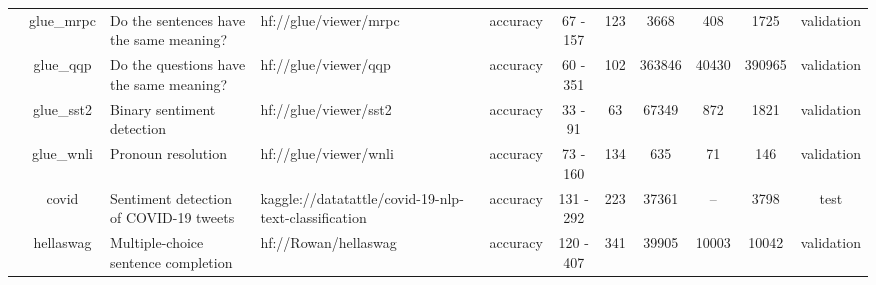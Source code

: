 \begin{landscape}
\begin{table}[ht]
{\begin{tabular}{ccllccccccc}
                                   & glue\_mrpc                          & Do the sentences have the same meaning?                               & hf://glue/viewer/mrpc                                        & accuracy                         & 67 - 157                                  & 123                                     & 3668           & 408                 & 1725          & validation                                                              \\
                                   & glue\_qqp                           & Do the questions have the same meaning?                               & hf://glue/viewer/qqp                                         & accuracy                         & 60 - 351                                  & 102                                     & 363846         & 40430               & 390965        & validation                                                              \\
                                   & glue\_sst2                          & Binary sentiment detection                                            & hf://glue/viewer/sst2                                        & accuracy                         & 33 - 91                                   & 63                                      & 67349          & 872                 & 1821          & validation                                                              \\
                                   & glue\_wnli                          & Pronoun resolution                                                    & hf://glue/viewer/wnli                                        & accuracy                         & 73 - 160                                  & 134                                     & 635            & 71                  & 146           & validation                                                              \\
                                   & covid                               & Sentiment detection of COVID-19 tweets                                & kaggle://datatattle/covid-19-nlp-text-classification         & accuracy                         & 131 - 292                                 & 223                                     & 37361          & --                  & 3798          & test                                                                    \\
                                   & hellaswag                           & Multiple-choice sentence completion                                   & hf://Rowan/hellaswag                                         & accuracy                         & 120 - 407                                 & 341                                     & 39905          & 10003               & 10042         & validation                                                              \\

\end{tabular}}
\end{table}
\end{landscape}
